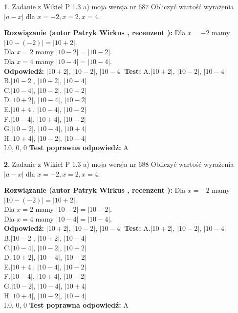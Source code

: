\documentclass[12pt, a4paper]{article}
\theoremstyle{definition} %
\newtheorem{zad}{}
\newcommand{\zadStart}[1]{\begin{zad}#1\newline}
\newcommand{\zadStop}{\end{zad}}
\newcommand{\rozwStart}[2]{\noindent \textbf{Rozwiązanie (autor #1 , recenzent #2): }\newline}
\newcommand{\rozwStop}{\newline}
\newcommand{\odpStart}{\noindent \textbf{Odpowiedź:}\newline}
\newcommand{\odpStop}{\newline}
\newcommand{\testStart}{\noindent \textbf{Test:}\newline}
\newcommand{\testStop}{\newline}
\newcommand{\kluczStart}{\noindent \textbf{Test poprawna odpowiedź:}\newline}
\newcommand{\kluczStop}{\newline}
\begin{document}
\zadStart{Zadanie z Wikieł P 1.3 a) moja wersja nr 687}
Obliczyć wartość wyrażenia $|a - x|$ dla $x=-2,x=2,x=4$.
\zadStop
\rozwStart{Patryk Wirkus}{}
Dla $x = -2$ mamy $|10 - (-2)| = |10 + 2|$.\\
Dla $x = 2$ mamy $|10 - 2| = |10 - 2|$.\\
Dla $x = 4$ mamy $|10 - 4| = |10 - 4|$.\\
\rozwStop
\odpStart
$|10 + 2|$, $|10 - 2|$, $|10 - 4|$
\odpStop
\testStart
A.$|10 + 2|$, $|10 - 2|$, $|10 - 4|$\\
B.$|10 - 2|$, $|10 + 2|$, $|10 - 4|$\\
C.$|10 - 4|$, $|10 - 2|$, $|10 + 2|$\\
D.$|10 + 2|$, $|10 - 4|$, $|10 - 2|$\\
E.$|10 + 4|$, $|10 - 4|$, $|10 - 2|$\\
F.$|10 - 4|$, $|10 + 4|$, $|10 - 2|$\\
G.$|10 - 2|$, $|10 - 4|$, $|10 + 4|$\\
H.$|10 + 4|$, $|10 - 2|$, $|10 - 4|$\\
I.$0$, $0$, $0$
\testStop
\kluczStart
A
\kluczStop



\zadStart{Zadanie z Wikieł P 1.3 a) moja wersja nr 688}
Obliczyć wartość wyrażenia $|a - x|$ dla $x=-2,x=2,x=4$.
\zadStop
\rozwStart{Patryk Wirkus}{}
Dla $x = -2$ mamy $|10 - (-2)| = |10 + 2|$.\\
Dla $x = 2$ mamy $|10 - 2| = |10 - 2|$.\\
Dla $x = 4$ mamy $|10 - 4| = |10 - 4|$.\\
\rozwStop
\odpStart
$|10 + 2|$, $|10 - 2|$, $|10 - 4|$
\odpStop
\testStart
A.$|10 + 2|$, $|10 - 2|$, $|10 - 4|$\\
B.$|10 - 2|$, $|10 + 2|$, $|10 - 4|$\\
C.$|10 - 4|$, $|10 - 2|$, $|10 + 2|$\\
D.$|10 + 2|$, $|10 - 4|$, $|10 - 2|$\\
E.$|10 + 4|$, $|10 - 4|$, $|10 - 2|$\\
F.$|10 - 4|$, $|10 + 4|$, $|10 - 2|$\\
G.$|10 - 2|$, $|10 - 4|$, $|10 + 4|$\\
H.$|10 + 4|$, $|10 - 2|$, $|10 - 4|$\\
I.$0$, $0$, $0$
\testStop
\kluczStart
A
\kluczStop
\end{document}

